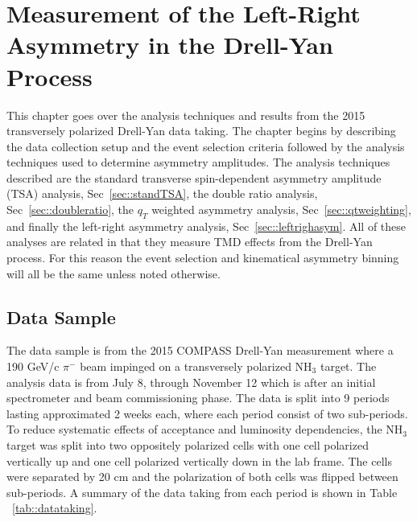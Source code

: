 \chapter{Measurement of the Left-Right Asymmetry in the Drell-Yan Process} 
\label{ch::leftright}
\ifpdf
\graphicspath{{Chapters/LeftRight/Figs/}}
\fi

This chapter goes over the analysis techniques and results from the 2015
transversely polarized Drell-Yan data taking.  The chapter begins by describing
the data collection setup and the event selection criteria followed by the
analysis techniques used to determine asymmetry amplitudes.  The analysis
techniques described are the standard transverse spin-dependent asymmetry
amplitude (TSA) analysis, Sec~\ref{sec::standTSA}, the double ratio analysis,
Sec~\ref{sec::doubleratio}, the $q_T$ weighted asymmetry analysis,
Sec~\ref{sec::qtweighting}, and finally the left-right asymmetry analysis,
Sec~\ref{sec::leftrighasym}.  All of these analyses are related in that they
measure TMD effects from the Drell-Yan process.  For this reason the event
selection and kinematical asymmetry binning will all be the same unless noted
otherwise.

\section{Data Sample} \label{sec::datasample}
The data sample is from the 2015 COMPASS Drell-Yan measurement where a 190 GeV/c
$\pi^-$ beam impinged on a transversely polarized NH$_3$ target.  The analysis
data is from July 8, through November 12 which is after an initial spectrometer
and beam commissioning phase.  The data is split into 9 periods lasting
approximated 2 weeks each, where each period consist of two sub-periods.  To
reduce systematic effects of acceptance and luminosity dependencies, the NH$_3$
target was split into two oppositely polarized cells with one cell polarized
vertically up and one cell polarized vertically down in the lab frame.  The
cells were separated by 20 cm and the polarization of both cells was flipped
between sub-periods.  A summary of the data taking from each period is shown in
Table ~\ref{tab::datataking}.

